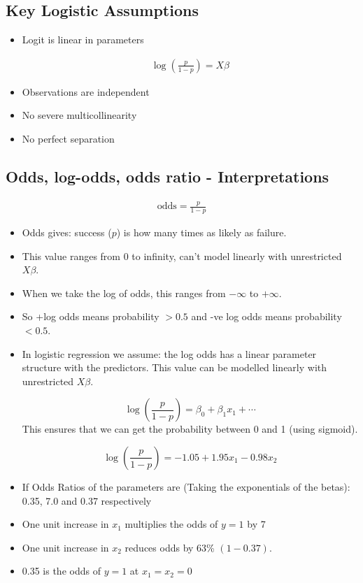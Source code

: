 \documentclass[10pt,a4paper]{article}
\begin{document}
	\subsection{Key Logistic Assumptions}
	\begin{itemize}
		\item Logit is linear in parameters

	\begin{align*}
			\log\left(\frac{p}{1-p}\right) = X\beta
	\end{align*}

		\item Observations are independent
		\item No severe multicollinearity
		\item No perfect separation
	\end{itemize}

	\subsection{Odds, log-odds, odds ratio - Interpretations}

	\begin{align*}
		\text{odds} = \frac{p}{1-p}
	\end{align*}

	\begin{itemize}
		\item Odds gives: success ($p$) is how many times as likely as failure.
		\item This value ranges from 0 to infinity, can't model linearly with unrestricted $X\beta$.
		\item When we take the log of odds, this ranges from $-\infty$ to $+\infty$.
		\item So +log odds means probability $> 0.5$ and -ve log odds means probability $< 0.5$.
		\item In logistic regression we assume: the log odds has a linear parameter structure with the predictors. This value can be modelled linearly with unrestricted $X\beta$.

	$$		\log\left(\frac{p}{1-p}\right) = \beta_0 + \beta_1 x_1 + \cdots
	$$
		This ensures that we can get the probability between 0 and 1 (using sigmoid).

	$$		\log\left(\frac{p}{1-p}\right) = -1.05 + 1.95 x_1 - 0.98 x_2
	$$
		\item If Odds Ratios of the parameters are (Taking the exponentials of the betas): 0.35, 7.0 and 0.37 respectively
		\item One unit increase in $x_1$ multiplies the odds of $y=1$ by 7
		\item One unit increase in $x_2$ reduces odds by 63\% $(1-0.37)$.
		\item 0.35 is the odds of $y=1$ at $x_1 = x_2 = 0$
	\end{itemize}
\end{document}
